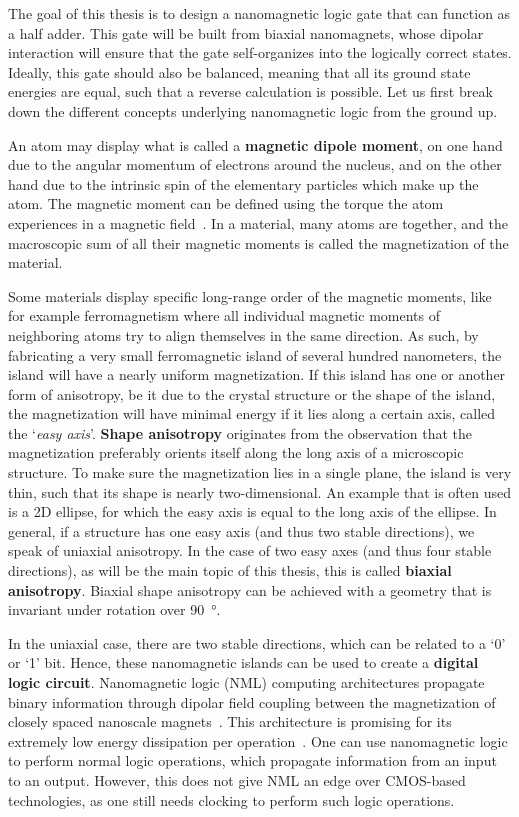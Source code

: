 \documentclass[11pt,a4paper,english,twoside]{article}
\begin{document}
\noindent The goal of this thesis is to design a nanomagnetic logic gate that can function as a half adder. This gate will be built from biaxial nanomagnets, whose dipolar interaction will ensure that the gate self-organizes into the logically correct states. Ideally, this gate should also be balanced, meaning that all its ground state energies are equal, such that a reverse calculation is possible. Let us first break down the different concepts underlying nanomagnetic logic from the ground up. \par
An atom may display what is called a \textbf{magnetic dipole moment}, on one hand due to the angular momentum of electrons around the nucleus, and on the other hand due to the intrinsic spin of the elementary particles which make up the atom. The magnetic moment can be defined using the torque the atom experiences in a magnetic field~\cite{IntroMagneticMaterials}. In a material, many atoms are together, and the macroscopic sum of all their magnetic moments is called the magnetization of the material. \par
Some materials display specific long-range order of the magnetic moments, like for example ferromagnetism where all individual magnetic moments of neighboring atoms try to align themselves in the same direction. As such, by fabricating a very small ferromagnetic island of several hundred nanometers, the island will have a nearly uniform magnetization. If this island has one or another form of anisotropy, be it due to the crystal structure or the shape of the island, the magnetization will have minimal energy if it lies along a certain axis, called the `\textit{easy axis}'. \textbf{Shape anisotropy} originates from the observation that the magnetization preferably orients itself along the long axis of a microscopic structure. To make sure the magnetization lies in a single plane, the island is very thin, such that its shape is nearly two-dimensional. An example that is often used is a 2D ellipse, for which the easy axis is equal to the long axis of the ellipse. In general, if a structure has one easy axis (and thus two stable directions), we speak of uniaxial anisotropy. In the case of two easy axes (and thus four stable directions), as will be the main topic of this thesis, this is called \textbf{biaxial anisotropy}. Biaxial shape anisotropy can be achieved with a geometry that is invariant under rotation over \SI{90}{\degree}. \par
In the uniaxial case, there are two stable directions, which can be related to a `0' or `1' bit. Hence, these nanomagnetic islands can be used to create a \textbf{digital logic circuit}. Nanomagnetic logic (NML) computing architectures propagate binary information through dipolar field coupling between the magnetization of closely spaced nanoscale magnets~\cite{SubnanosecondPropagation_AnisotropyChains}. This architecture is promising for its extremely low energy dissipation per operation~\cite{SubnanosecondPropagation_AnisotropyChains,FourStateLogic,MQCA_RoomTemp}. One can use nanomagnetic logic to perform normal logic operations, which propagate information from an input to an output. However, this does not give NML an edge over CMOS-based technologies, as one still needs clocking to perform such logic operations. \par 
\end{document}
